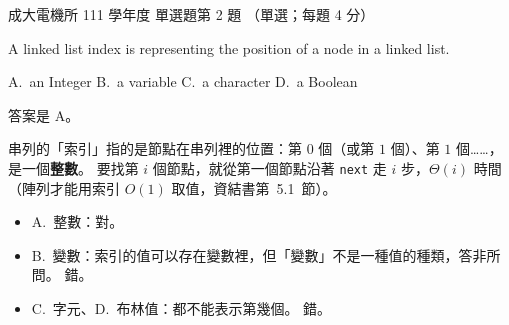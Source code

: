 \begin{pastexam}[label={px:ncku-111-ee-ds-02}]{成大電機所 111 學年度 單選題第 2 題}
（單選；每題 4 分）

A linked list index is \underline{\hspace{2em}}representing the position of a node in a linked list.

A.~an Integer \qquad B.~a variable \qquad C.~a character \qquad D.~a Boolean
\end{pastexam}

\begin{pastsoln}
答案是 A。

串列的「索引」指的是節點在串列裡的位置：第 $0$ 個（或第 $1$ 個）、第 $1$ 個……，是一個\textbf{整數}。 要找第 $i$
個節點，就從第一個節點沿著 \texttt{next} 走 $i$ 步，$\Theta(i)$ 時間（陣列才能用索引 $O(1)$ 取值，資結書第~5.1~節）。
\begin{itemize}
\item A.~整數：對。
\item B.~變數：索引的值可以存在變數裡，但「變數」不是一種值的種類，答非所問。 錯。
\item C.~字元、D.~布林值：都不能表示第幾個。 錯。
\end{itemize}
\end{pastsoln}
